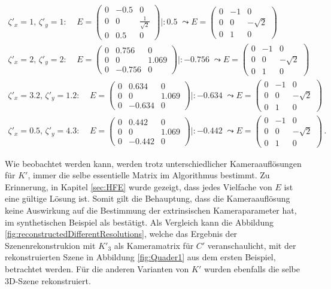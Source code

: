 \begin{gather*}
	\zeta'_x = 1, \, \zeta'_y = 1: \; \; \;\;
	E = \begin{pmatrix}
		0&-0.5&0\\
		0&0&\frac{1}{\sqrt{2}}\\
		0&0.5&0
	\end{pmatrix} |: 0.5 \; \leadsto
	E = \begin{pmatrix}
		0&-1&0\\
		0&0&-\sqrt{2}\\
		0&1&0
	\end{pmatrix}\\
	\zeta'_x = 2, \, \zeta'_y = 2: \; \; \;\;
	E = \begin{pmatrix}
		0&0.756&0\\
		0&0&1.069\\
		0&-0.756&0
	\end{pmatrix} |: -0.756 \; \leadsto
	E = \begin{pmatrix}
		0&-1&0\\
		0&0&-\sqrt{2}\\
		0&1&0
	\end{pmatrix}\\
	\zeta'_x = 3.2, \, \zeta'_y = 1.2: \; \; \;\;
	E = \begin{pmatrix}
		0&0.634&0\\
		0&0&1.069\\
		0&-0.634&0
	\end{pmatrix} |: -0.634 \; \leadsto
	E = \begin{pmatrix}
		0&-1&0\\
		0&0&-\sqrt{2}\\
		0&1&0
	\end{pmatrix}\\
	\zeta'_x = 0.5, \, \zeta'_y = 4.3: \; \; \;\;
	E = \begin{pmatrix}
		0&0.442&0\\
		0&0&1.069\\
		0&-0.442&0
	\end{pmatrix} |: -0.442 \; \leadsto
	E = \begin{pmatrix}
		0&-1&0\\
		0&0&-\sqrt{2}\\
		0&1&0
	\end{pmatrix} \, . 
\end{gather*}

Wie beobachtet werden kann, werden trotz unterschiedlicher Kameraauflösungen für $K'$, immer die selbe essentielle Matrix im Algorithmus bestimmt. Zu Erinnerung, in Kapitel \ref{sec:HFE} wurde gezeigt, dass jedes Vielfache von $E$ ist eine gültige Lösung ist. Somit gilt die Behauptung, dass die Kameraauflösung keine Auswirkung auf die Bestimmung der extrinsischen Kameraparameter hat, im synthetischen Beispiel als bestätigt. Als Vergleich kann die Abbildung \ref{fig:reconstructedDifferentResolutions}, welche das Ergebnis der Szenenrekonstrukion mit $K'_3$ als Kameramatrix für $C'$ veranschaulicht, mit der rekonstruierten Szene in Abbildung \ref{fig:Quader1} aus dem ersten Beispiel, betrachtet werden. Für die anderen Varianten von $K'$ wurden ebenfalls die selbe 3D-Szene rekonstruiert.\\ 





